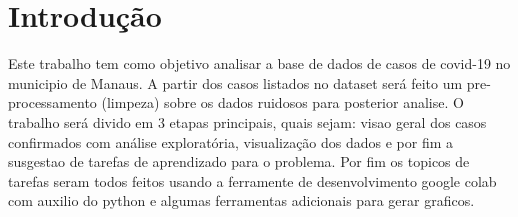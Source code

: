 \section{Introdução}
Este trabalho tem como objetivo analisar a base de dados de casos de covid-19 no municipio de Manaus. A partir dos casos listados no dataset será feito um pre-processamento (limpeza) sobre os dados ruidosos para posterior analise. O trabalho será divido em 3 etapas principais, quais sejam: visao geral dos  casos confirmados com análise exploratória, visualização dos dados e por fim a susgestao de tarefas de aprendizado para o problema. Por fim os topicos de tarefas seram todos feitos usando a ferramente de desenvolvimento google colab com auxilio do python e algumas ferramentas adicionais para gerar graficos.